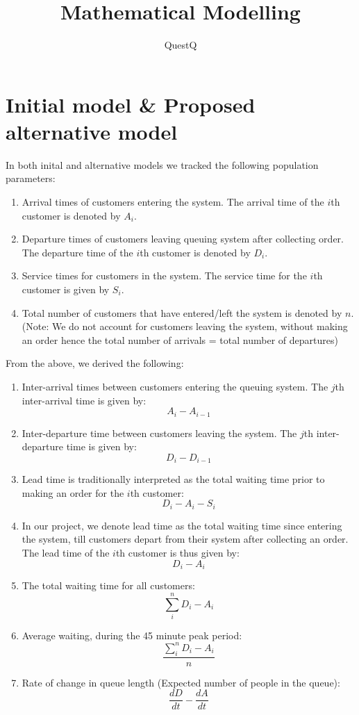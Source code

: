 \documentclass{article}
\begin{document}
\pagecolor{ultramarine}
\title{Mathematical Modelling}
\author{QuestQ}
\date{}
\maketitle
\section*{Initial model \& Proposed alternative model}
In both inital and alternative models we tracked the following population parameters:
\begin{enumerate}
    \item Arrival times of customers entering the system. The arrival time of the $i$th customer is denoted by $A_i$.
    \item Departure times of customers leaving queuing system after collecting order. The departure time of the $i$th customer is denoted by $D_i$.
    \item Service times for customers in the system. The service time for the $i$th customer is given by $S_i$.
    \item Total number of customers that have entered/left the system is denoted by $n$. (Note: We do not account for customers leaving the system, without making an order hence the total number of arrivals = total number of departures)
\end{enumerate}
From the above, we derived the following:
\begin{enumerate}
    \item Inter-arrival times between customers entering the queuing system. The $j$th inter-arrival time is given by: \[A_i-A_{i-1}\]
    \item Inter-departure time between customers leaving the system. The $j$th inter-departure time is given by: \[D_i-D_{i-1}\]
    \item Lead time is traditionally interpreted as the total waiting time prior to making an order for the $i$th customer:
    \[D_i-A_i-S_i\]
    \item In our project, we denote lead time as the total waiting time since entering the system, till customers depart from their system after collecting an order. 
    The lead time of the $i$th customer is thus given by: \[D_i-A_i\]
    \item The total waiting time for all customers: \[\sum_i^n D_i-A_i\]
    \item Average waiting, during the 45 minute peak period:
    \[\frac{\sum_i^n D_i-A_i}{n}\]
    \item Rate of change in queue length (Expected number of people in the queue):
    \[\frac{dD}{dt}-\frac{dA}{dt}\]
\end{enumerate}
\end{document}
